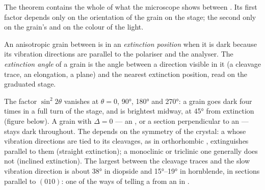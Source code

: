 The theorem contains the whole of what the microscope shows between . Its first factor depends only on the orientation of the grain on the
stage; the second only on the grain's  and on the colour of the
light.

\begin{definition}\label{def:b1:optical-mineralogy:extinction}
An anisotropic grain between  is in an \emph{extinction
position} when it is dark because its vibration
directions are parallel to the polariser and the analyser. The
\emph{extinction angle} of a grain is the angle
between a direction visible in it (a cleavage trace, an elongation, a 
plane) and the nearest extinction position, read on the graduated stage.
\end{definition}

The factor $\sin^2 2\theta$ vanishes at $\theta = 0$, \ang{90}, \ang{180} and
\ang{270}: a grain goes dark four times in a full turn of the stage, and is
brightest midway, at \ang{45} from extinction (figure below). A grain with
$\Delta = 0$ --- an , or a section perpendicular to an  --- stays dark throughout. The  depends on the symmetry
of the crystal: a  whose vibration directions are tied to its
cleavages, as in orthorhombic , extinguishes parallel to them
(straight extinction); a monoclinic or triclinic one generally does not
(inclined extinction). The largest  between the cleavage
traces and the slow vibration direction is about \ang{38} in diopside and
\ang{15}--\ang{19} in hornblende, in sections parallel to $(010)$: one of the
ways of telling a  from an  in .

